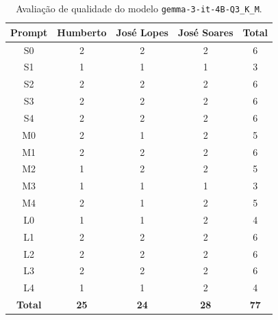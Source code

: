 \begin{table}[H]
    \centering
    \begin{tabular}{|c|c|c|c|c|}
        \hline
        \textbf{Prompt}      &
        \textbf{Humberto}    &
        \textbf{José Lopes}  &
        \textbf{José Soares} &
        \textbf{Total}       \\ \hline

        S0 & 2 & 2 & 2 & 6 \\ \hline
        S1 & 1 & 1 & 1 & 3 \\ \hline
        S2 & 2 & 2 & 2 & 6 \\ \hline
        S3 & 2 & 2 & 2 & 6 \\ \hline
        S4 & 2 & 2 & 2 & 6 \\ \hline
        M0 & 2 & 1 & 2 & 5 \\ \hline
        M1 & 2 & 2 & 2 & 6 \\ \hline
        M2 & 1 & 2 & 2 & 5 \\ \hline
        M3 & 1 & 1 & 1 & 3 \\ \hline
        M4 & 2 & 1 & 2 & 5 \\ \hline
        L0 & 1 & 1 & 2 & 4 \\ \hline
        L1 & 2 & 2 & 2 & 6 \\ \hline
        L2 & 2 & 2 & 2 & 6 \\ \hline
        L3 & 2 & 2 & 2 & 6 \\ \hline
        L4 & 1 & 1 & 2 & 4 \\ \hline

        \textbf{Total} & \textbf{25} & \textbf{24} & \textbf{28} & \textbf{77} \\ \hline
    \end{tabular}
    \caption{Avaliação de qualidade do modelo \texttt{gemma-3-it-4B-Q3\_K\_M}.}
\end{table}

